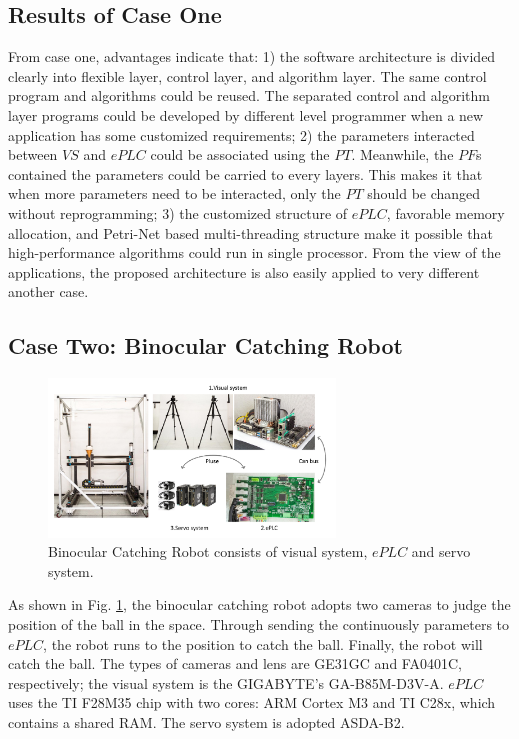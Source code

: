\documentclass[journal,UTF8]{IEEEtran}
\begin{document}
\subsection{Results of Case One}
From case one, advantages indicate that: 1) the software architecture is divided clearly into flexible layer, control layer, and algorithm layer. The same control program and algorithms could be reused. The separated control and algorithm layer programs could be developed by different level programmer when a new application has some customized requirements; 2) the parameters interacted between $VS$ and $ePLC$ could be associated using the $PT$. Meanwhile, the $PF$s contained the parameters could be carried to every layers. This makes it that when more parameters need to be interacted, only the $PT$ should be changed without reprogramming; 3) the customized structure of $ePLC$, favorable memory allocation, and Petri-Net based multi-threading structure make it possible that high-performance algorithms could run in single processor. From the view of the applications, the proposed architecture is also easily applied to very different another case.

 
\subsection{Case Two: Binocular Catching Robot}
\begin{figure}
	\centering
	\includegraphics[width=3in]{fig/robot.pdf}
	\caption{ Binocular Catching Robot consists of visual system, $ePLC$ and servo system.}
	\label{fig:robot}
\end{figure}
As shown in Fig. \ref{fig:robot}, the binocular catching robot adopts two cameras to judge the position of the ball in the space. Through sending the continuously parameters to $ePLC$, the robot runs to the position to catch the ball. Finally, the robot will catch the ball. The types of cameras and lens are GE31GC and FA0401C, respectively; the visual system is the GIGABYTE's GA-B85M-D3V-A. $ePLC$ uses the TI F28M35 chip with two cores: ARM Cortex M3 and TI C28x, which contains a shared RAM. The servo system is adopted ASDA-B2. 
\end{document}
